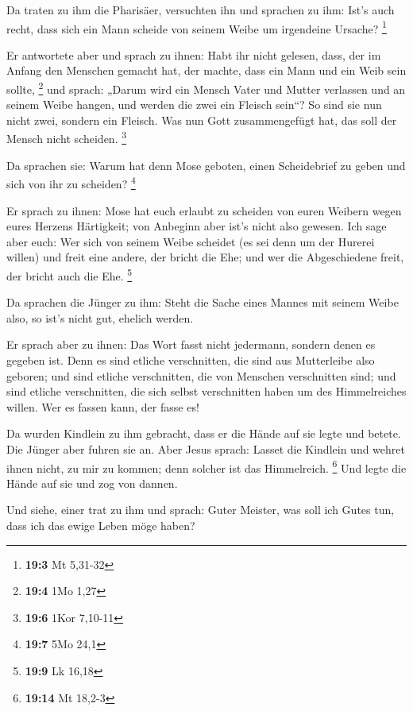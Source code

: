  Da traten zu ihm die Pharisäer, versuchten ihn und
sprachen zu ihm: Ist's auch recht, dass sich ein Mann scheide von seinem
Weibe um irgendeine Ursache? \footnote{\textbf{19:3} Mt 5,31-32}

 Er antwortete aber und sprach zu ihnen: Habt ihr nicht
gelesen, dass, der im Anfang den Menschen gemacht hat, der machte, dass
ein Mann und ein Weib sein sollte, \footnote{\textbf{19:4} 1Mo 1,27}
 und sprach: „Darum wird ein Mensch Vater und Mutter
verlassen und an seinem Weibe hangen, und werden die zwei ein Fleisch
sein``?  So sind sie nun nicht zwei, sondern ein Fleisch.
Was nun Gott zusammengefügt hat, das soll der Mensch nicht scheiden.
\footnote{\textbf{19:6} 1Kor 7,10-11}

 Da sprachen sie: Warum hat denn Mose geboten, einen
Scheidebrief zu geben und sich von ihr zu scheiden? \footnote{\textbf{19:7}
  5Mo 24,1}

 Er sprach zu ihnen: Mose hat euch erlaubt zu scheiden von
euren Weibern wegen eures Herzens Härtigkeit; von Anbeginn aber ist's
nicht also gewesen.  Ich sage aber euch: Wer sich von
seinem Weibe scheidet (es sei denn um der Hurerei willen) und freit eine
andere, der bricht die Ehe; und wer die Abgeschiedene freit, der bricht
auch die Ehe. \footnote{\textbf{19:9} Lk 16,18}

 Da sprachen die Jünger zu ihm: Steht die Sache eines
Mannes mit seinem Weibe also, so ist's nicht gut, ehelich werden.

 Er sprach aber zu ihnen: Das Wort fasst nicht jedermann,
sondern denen es gegeben ist.  Denn es sind etliche
verschnitten, die sind aus Mutterleibe also geboren; und sind etliche
verschnitten, die von Menschen verschnitten sind; und sind etliche
verschnitten, die sich selbst verschnitten haben um des Himmelreiches
willen. Wer es fassen kann, der fasse es!

 Da wurden Kindlein zu ihm gebracht, dass er die Hände
auf sie legte und betete. Die Jünger aber fuhren sie an. 
Aber Jesus sprach: Lasset die Kindlein und wehret ihnen nicht, zu mir zu
kommen; denn solcher ist das Himmelreich. \footnote{\textbf{19:14} Mt
  18,2-3}  Und legte die Hände auf sie und zog von
dannen.

 Und siehe, einer trat zu ihm und sprach: Guter Meister,
was soll ich Gutes tun, dass ich das ewige Leben möge haben?

